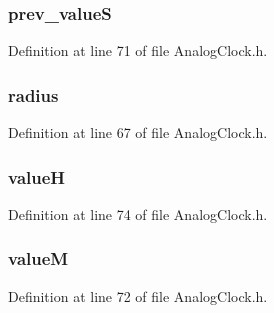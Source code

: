 \subsubsection[{prev\+\_\+value\+S}]{ prev\+\_\+value\+S}\label{struct_a_n_a_l_o_g_c_l_o_c_k_a9a263ee0b5260f4a76b1933bcdd83dde}


Definition at line 71 of file Analog\+Clock.\+h.

\hypertarget{struct_a_n_a_l_o_g_c_l_o_c_k_ae5bf5300978dec1b6c69ee537e1c98f8}{}
\subsubsection[{radius}]{ radius}\label{struct_a_n_a_l_o_g_c_l_o_c_k_ae5bf5300978dec1b6c69ee537e1c98f8}


Definition at line 67 of file Analog\+Clock.\+h.

\hypertarget{struct_a_n_a_l_o_g_c_l_o_c_k_a643069815f1587ae65a480bff07f1fad}{}
\subsubsection[{value\+H}]{ value\+H}\label{struct_a_n_a_l_o_g_c_l_o_c_k_a643069815f1587ae65a480bff07f1fad}


Definition at line 74 of file Analog\+Clock.\+h.

\hypertarget{struct_a_n_a_l_o_g_c_l_o_c_k_aac3f32c2bc541f64ed3eeefbb987c363}{}
\subsubsection[{value\+M}]{ value\+M}\label{struct_a_n_a_l_o_g_c_l_o_c_k_aac3f32c2bc541f64ed3eeefbb987c363}


Definition at line 72 of file Analog\+Clock.\+h.

